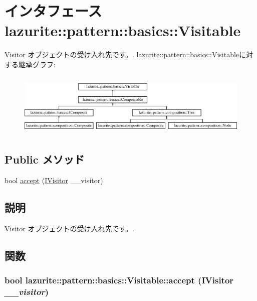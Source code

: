 \hypertarget{interfacelazurite_1_1pattern_1_1basics_1_1_visitable}{
\section{インタフェース lazurite::pattern::basics::Visitable}
\label{interfacelazurite_1_1pattern_1_1basics_1_1_visitable}
}


Visitor オブジェクトの受け入れ先です。.  
lazurite::pattern::basics::Visitableに対する継承グラフ:\begin{figure}[H]
\begin{center}
\leavevmode
\includegraphics[height=3.0854cm]{interfacelazurite_1_1pattern_1_1basics_1_1_visitable}
\end{center}
\end{figure}
\subsection*{Public メソッド}
\begin{DoxyCompactItemize}
\item 
bool \hyperlink{interfacelazurite_1_1pattern_1_1basics_1_1_visitable_af4c08a6a8590e3cd4e8c173024740bdf}{accept} (\hyperlink{interfacelazurite_1_1pattern_1_1basics_1_1_i_visitor}{IVisitor} \_\-\_\-visitor)
\end{DoxyCompactItemize}


\subsection{説明}
Visitor オブジェクトの受け入れ先です。. 

\subsection{関数}
\hypertarget{interfacelazurite_1_1pattern_1_1basics_1_1_visitable_af4c08a6a8590e3cd4e8c173024740bdf}{
\subsubsection[{accept}]{\setlength{\rightskip}{0pt plus 5cm}bool lazurite::pattern::basics::Visitable::accept ({\bf IVisitor} {\em \_\-\_\-visitor})}}
\label{interfacelazurite_1_1pattern_1_1basics_1_1_visitable_af4c08a6a8590e3cd4e8c173024740bdf}

